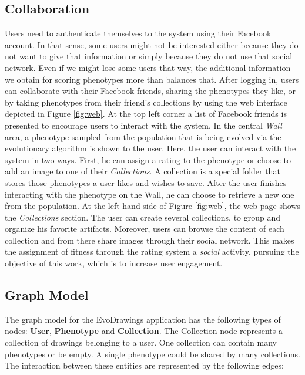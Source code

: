 \subsection{Collaboration}
\label{sec:col}
Users need to authenticate themselves to the system using their
Facebook account. In that sense, some users might not be interested
either because they do not want to give that information or simply because
they do not use that social network. Even if we might lose
some users that way, the additional information we obtain for scoring
phenotypes more than balances that. 
After logging in,
users can collaborate with their Facebook friends, 
sharing the phenotypes they like, or by taking phenotypes
from their friend's collections by using the web interface depicted 
in Figure \ref{fig:web}.
At the top left corner a list of Facebook friends is presented
to encourage users to interact with the system. In the central 
\emph{ Wall } area, a phenotype sampled from the population that is
being evolved via the evolutionary algorithm 
is shown to the user.
Here, the user can interact with the system in two ways.
First, he can assign a rating to the phenotype or choose to add an image to one of their \emph{Collections}.
A collection is a special folder that stores those phenotypes a user likes and wishes
to save. After the user finishes interacting with the phenotype
on the Wall, he can choose to retrieve a new one from the population.
At the left hand side of Figure \ref{fig:web}, the web page shows the \emph{Collections} section.
The user can create several collections, to group and organize his favorite 
artifacts. Moreover, users can browse the content of each collection and from
there share images through their social network. This makes the assignment 
of fitness through the rating system a {\em social} activity, 
pursuing the objective of this work, which is to increase user engagement.

\subsection{Graph Model} 
The graph model for the EvoDrawings application has the following types of
nodes: {\bf User}, {\bf Phenotype} and {\bf Collection}. The Collection node represents
a collection of drawings belonging to a user. One collection can contain many phenotypes 
or be empty. A single phenotype could be shared by many collections. The interaction 
between these entities are represented by the following edges:

